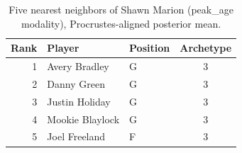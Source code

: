 \begin{table}[htbp]
  \centering\small
  \begin{tabular}{rllc}
    \toprule
    Rank & Player & Position & Archetype \\
    \midrule
    1 & Avery Bradley & G & 3 \\
    2 & Danny Green & G & 3 \\
    3 & Justin Holiday & G & 3 \\
    4 & Mookie Blaylock & G & 3 \\
    5 & Joel Freeland & F & 3 \\
    \bottomrule
  \end{tabular}
  \caption{Five nearest neighbors of Shawn Marion (peak_age modality), Procrustes-aligned posterior mean.}
  \label{tab:Shawn_Marion_neighbors_peak_age}
\end{table}

